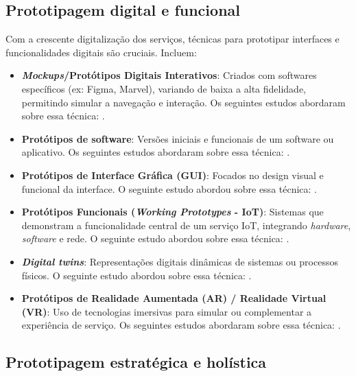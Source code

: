 \subsection{Prototipagem digital e funcional}

Com a crescente digitalização dos serviços, técnicas para prototipar interfaces e funcionalidades digitais são cruciais. Incluem:

\begin{itemize}
	\item \textbf{\textit{Mockups}/Protótipos Digitais Interativos}:  Criados com softwares específicos (ex: Figma, Marvel), variando de baixa a alta fidelidade, permitindo simular a navegação e interação. Os seguintes estudos abordaram sobre essa técnica: .
	
	\item \textbf{Protótipos de software}: Versões iniciais e funcionais de um software ou aplicativo. Os seguintes estudos abordaram sobre essa técnica: .
	
	\item \textbf{Protótipos de Interface Gráfica (GUI)}: Focados no design visual e funcional da interface. O seguinte estudo abordou sobre essa técnica: .
	
	\item \textbf{Protótipos Funcionais (\textit{Working Prototypes} - IoT)}: Sistemas que demonstram a funcionalidade central de um serviço IoT, integrando \textit{hardware}, \textit{software} e rede. O seguinte estudo abordou sobre essa técnica: .
	
	\item \textbf{\textit{Digital twins}}: Representações digitais dinâmicas de sistemas ou processos físicos. O seguinte estudo abordou sobre essa técnica: .
	
	\item \textbf{Protótipos de Realidade Aumentada (AR) / Realidade Virtual (VR)}: Uso de tecnologias imersivas para simular ou complementar a experiência de serviço. Os seguintes estudos abordaram sobre essa técnica: .
\end{itemize}

\subsection{Prototipagem estratégica e holística}

